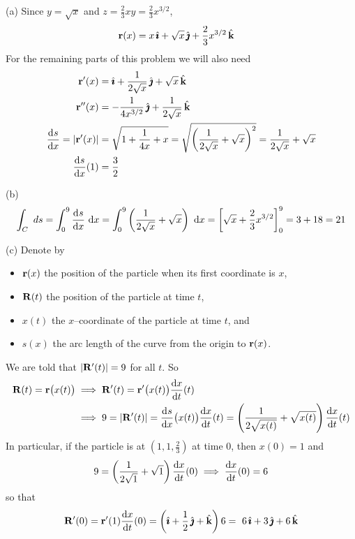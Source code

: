 \begin{solution} 
(a) 
Since $y=\sqrt{x}$ and $z=\frac{2}{3}xy=\frac{2}{3}x^{3/2}$,
\begin{align*}
\mathbf{r}(x)&=x\,\hat{\pmb{\imath}}+\sqrt{x}\,\hat{\pmb{\jmath}}+\frac{2}{3}x^{3/2}\,\hat{\mathbf{k}}
\end{align*}
For the remaining parts of this problem we will also need
\begin{align*}
\vr'(x)&=\hi+\frac{1}{2\sqrt{x}}\,\hj+\sqrt{x}\,\hk\\
\vr''(x)&=-\frac{1}{4x^{3/2}}\,\hj+\frac{1}{2\sqrt{x}}\,\hk\\
\diff{s}{x}=|\vr'(x)|
&=\sqrt{1+\frac{1}{4x}+x}
=\sqrt{\left(\frac{1}{2\sqrt{x}}+\sqrt{x}\right)^2}
=\frac{1}{2\sqrt{x}}+\sqrt{x}\\
\diff{s}{x}(1)&=\frac{3}{2}
\end{align*}

(b)
\begin{equation*}
\int_C \ ds
=\int_0^9 \diff{s}{x}\ \dee{x}
=\int_0^9 \left(\frac{1}{2\sqrt{x}}+\sqrt{x}\right)\ \dee{x}
=\left[\sqrt{x}+\frac{2}{3}x^{3/2}\right]_0^9
=3+18
=21
\end{equation*}

(c) 
Denote by
\begin{itemize}\itemsep1pt \parskip0pt  %
\item
  $\mathbf{r}(x)$ the position of the particle when its first coordinate is $x$,
\item
 $\mathbf{R}(t)$ the position of the particle at time $t$, 
\item 
  $x(t)$ the $x$--coordinate of the particle at time $t$, and
\item 
  $s(x)$ the arc length of the curve from the origin to $\mathbf{r}(x)$.
\end{itemize}
We are told that $|\mathbf{R}'(t)|=9$ for all $t$.
So
\begin{align*}
\vR(t)=\vr\big(x(t)\big)&\implies
\vR'(t)=\vr'\big(x(t)\big)\diff{x}{t}(t) \\
&\implies
9=|\vR'(t)|=\diff{s}{x}\big(x(t)\big) \diff{x}{t}(t)
=\left(\frac{1}{2\sqrt{x(t)}}+\sqrt{x(t)}\right)\diff{x}{t}(t)
\end{align*}
In particular, if the particle is at $(1,1,\frac{2}{3})$ at time $0$, then $x(0)=1$
and
\begin{equation*}
9=\left(\frac{1}{2\sqrt{1}}+\sqrt{1}\right)\diff{x}{t}(0)
\implies \diff{x}{t}(0)=6
\end{equation*}
so that
\begin{equation*}
\vR'(0)=\vr'(1)\diff{x}{t}(0)
=\left(\hi+\frac{1}{2}\,\hj+\hk\right)6
=\ 6\,\hi+3\,\hj+6\,\hk
\end{equation*}


\end{solution}
